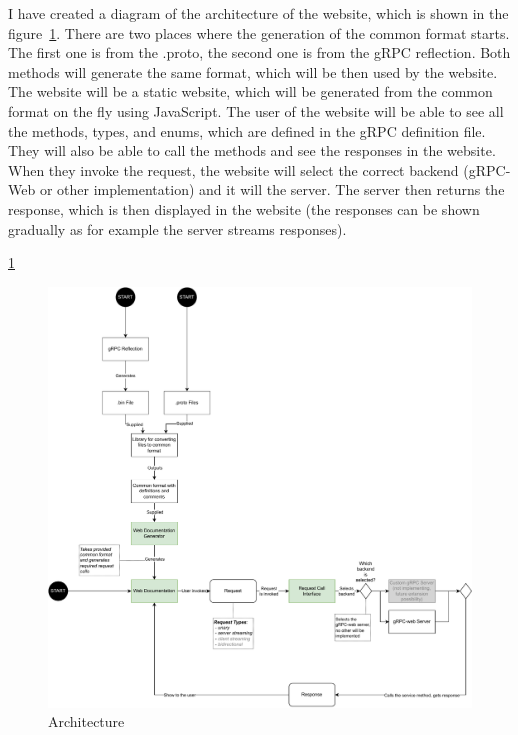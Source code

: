 I have created a diagram of the architecture of the website, which is shown in the figure~\ref{fig:grpcflair-architecture}.
There are two places where the generation of the common format starts.
The first one is from the .proto, the second one is from the gRPC reflection.
Both methods will generate the same format, which will be then used by the website.
The website will be a static website, which will be generated from the common format on the fly using JavaScript.
The user of the website will be able to see all the methods, types, and enums, which are defined in the gRPC definition file.
They will also be able to call the methods and see the responses in the website.
When they invoke the request, the website will select the correct backend (gRPC-Web or other implementation) and it will the server.
The server then returns the response, which is then displayed in the website (the responses can be shown gradually as for example the server streams responses).

\ref{fig:grpcflair-architecture}

\begin{figure}[hbt!]
    \centering
    \captionsetup{justification=centering}
    \includegraphics[width=1.0\textwidth]{images/design/grpcdoc-architecture}
    \caption{Architecture~\cite{protobuf-overview}}
    \label{fig:grpcflair-architecture}
\end{figure}


